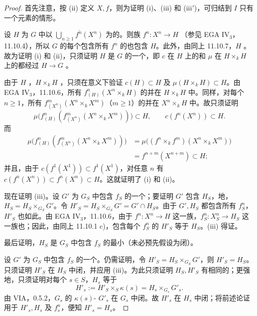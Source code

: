 \begin{proof}
首先注意，按 (ii) 定义 $X,f$，则为证明 (i)、(iii) 和 (iii$'$)，可归结到 $I$ 只有一个元素的情形。

设 $H$ 为 $G$ 中以 $\overline{\bigcup_{n\geq1}f^n(X^n)}$ 为的。则族 $f^n:X^n\to H$ （参见 EGA $\mathrm{IV}_3$，11.10.4），所以 $G$ 的每个包含所有 $f^n$ 的也包含 $H$。此外，由同上 11.10.7，$H$ 。故为证明 (i) 和 (ii)，只须证明 $H$ 是 $G$ 的一个，即 $c$ 在 $H$ 上的和 $\mu$ 在 $H\times_k H$ 上的都经过 $H\to G$ 。

由于 $H$ ，$H\times_k H$ ，只须在意义下验证 $c(H)\subset H$ 及 $\mu(H\times_k H)\subset H$。由 EGA $\mathrm{IV}_3$，11.10.6，所有 $f^n_{(H)}(X^n\times_k H)$ 的并在 $H\times_k H$ 中。同样，对每个 $n\geq1$，所有 $f^m_{(X^n)}(X^n\times_k X^m)$（$m\geq1$）的并在 $X^n\times_k H$ 中。故只须证明
\[
\mu\bigl(f^n_{(H)}(f^m_{(X^n)}(X^n\times_k X^m))\bigr)\subset H,
\qquad c(f^n(X^n))\subset H.
\]
而
\[
\begin{aligned}
\mu\bigl(f^n_{(H)}(f^m_{(X^n)}(X^n\times_k X^m))\bigr)
&=\mu\bigl((f^n\times_k f^m)(X^n\times_k X^m)\bigr)\\
&=f^{n+m}(X^{n+m})\subset H;
\end{aligned}
\]
并且，由于 $c(f^1(X^1))\subset f^1(X^1)$，对任意 $n$ 有 $c(f^n(X^n))\subset f^n(X^n)\subset H$。这就证明了 (i) 和 (ii)。

现在证明 (iii)。设 $G'$ 为 $G_S$ 中包含 $f_S$ 的一个；要证明 $G'$ 包含 $H_S$，地，$H_S=H_S\times_{G_S}G'$。令 $H'_S=H_S\times_{G_S}G'=G'\cap H_S$。由于 $G',H_S$ 都包含所有 $f^n_S$，$H'_S$ 也如此。由 EGA $\mathrm{IV}_3$，11.10.6，由于 $f^n:X^n\to H$ 这一族，$f^n_S:X^n_S\to H_S$ 这一族也；因此，由同上 11.10.1 c)，包含每个 $f^n_S$ 的 $H'_S$ 等于 $H_S$。(iii) 得证。

最后证明，$H_S$ 是 $G_S$ 中包含 $f_S$ 的最小（未必预先假设为闭）。

设 $G'$ 为 $G_S$ 中包含 $f_S$ 的一个。仍需证明，令 $H'_S=H_S\times_{G_S}G'$，则 $H'_S=H_S$。只须证明 $H'_S$ 在 $H_S$ 中闭，并应用 (iii)。为此只须证明 $H_S,H'_S$ 有相同的；更强地，只须证明对每个 $s\in S$，$H_s$ 等于
\[
H'_s:=H'_S\times_S\kappa(s)=H_s\times_{G_s}G'_s.
\]
由 VIA，0.5.2，$G_s$ 的 $\kappa(s)$- $G'_s$ 在 $G_s$ 中闭。故 $H'_s$ 在 $H_s$ 中闭；将前述论证用于 $H'_s,H_s$ 及 $f^n_s$，便知 $H'_s=H_s$。
\end{proof}

